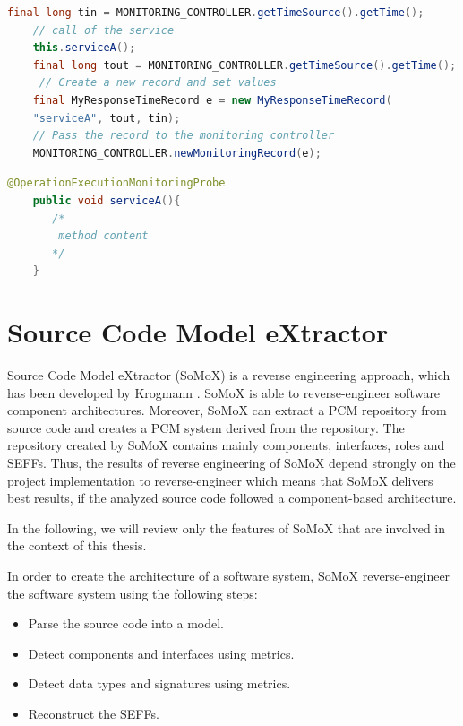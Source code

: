 \begin{lstlisting}[caption={Example of manual instrumentation of source code},label={lst:kieker_manual_instr}, captionpos=b, language=java] 
    final long tin = MONITORING_CONTROLLER.getTimeSource().getTime();
    // call of the service
    this.serviceA();
    final long tout = MONITORING_CONTROLLER.getTimeSource().getTime();
     // Create a new record and set values
    final MyResponseTimeRecord e = new MyResponseTimeRecord(
    "serviceA", tout, tin);
    // Pass the record to the monitoring controller
    MONITORING_CONTROLLER.newMonitoringRecord(e);
\end{lstlisting}


\begin{lstlisting}[caption={Example of a Kieker Probe using AOP},label={lst:kieker_aop_instr}, captionpos=b, language=java] 
    @OperationExecutionMonitoringProbe
    public void serviceA(){
       /*
        method content
       */
    }
\end{lstlisting}


\section{Source Code Model eXtractor}
\label{sec:Source Code Model eXtractor}
Source Code Model eXtractor (SoMoX) is a reverse engineering approach, which has been developed by Krogmann \cite{krogmann2012reconstruction}. SoMoX is able to reverse-engineer software component architectures. Moreover, SoMoX can extract a PCM repository from source code and creates a PCM system derived from the repository. The repository created by SoMoX contains mainly components, interfaces, roles and SEFFs. Thus, the results of reverse engineering of SoMoX depend strongly on the project implementation to reverse-engineer which means that SoMoX delivers best results, if the analyzed source code followed a component-based architecture.

In the following, we will review only the features of SoMoX that are involved in the context of this thesis. 

In order to create the architecture of a software system, SoMoX reverse-engineer the software system using the following steps:
\begin{itemize}
\item Parse the source code into a model.  
\item Detect components and interfaces using metrics.
\item Detect data types and signatures using metrics.
\item Reconstruct the SEFFs.
\end{itemize}

